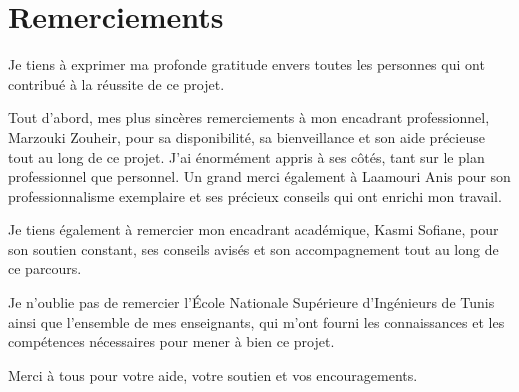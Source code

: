 \chapter*{Remerciements}
\thispagestyle{MyStyle}


Je tiens à exprimer ma profonde gratitude envers toutes les personnes qui ont contribué à la réussite de ce projet.\par

\vspace{0.3cm}

\noindent Tout d’abord, mes plus sincères remerciements à mon encadrant professionnel, Marzouki Zouheir, pour sa disponibilité, sa bienveillance et son aide précieuse tout au long de ce projet. J’ai énormément appris à ses côtés, tant sur le plan professionnel que personnel. Un grand merci également à Laamouri Anis pour son professionnalisme exemplaire et ses précieux conseils qui ont enrichi mon travail.\par


\vspace{0.3cm}

\noindent Je tiens également à remercier mon encadrant académique, Kasmi Sofiane, pour son soutien constant, ses conseils avisés et son accompagnement tout au long de ce parcours.\par

\vspace{0.3cm}

\noindent Je n’oublie pas de remercier l’École Nationale Supérieure d’Ingénieurs de Tunis ainsi que l’ensemble de mes enseignants, qui m’ont fourni les connaissances et les compétences nécessaires pour mener à bien ce projet.\par

\vspace{0.3cm}
\noindent Merci à tous pour votre aide, votre soutien et vos encouragements.\par
